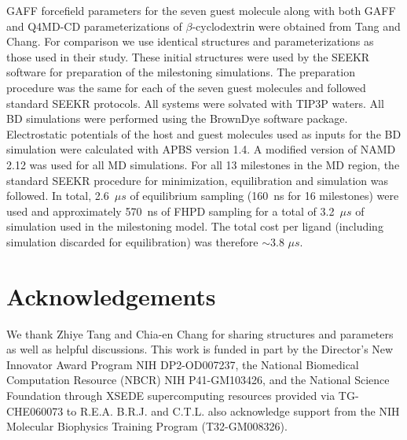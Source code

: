 \par GAFF\cite{Wang2004,Wang2006} forcefield parameters for the seven guest molecule
along with both GAFF and Q4MD-CD\cite{Cezard2011} parameterizations of $\beta$-cyclodextrin
were obtained from Tang and Chang\cite{Tang2017}. For comparison we use identical structures and
parameterizations as those used in their study. These initial structures were
used by the SEEKR software for preparation of the milestoning simulations.
The preparation procedure was the same for each of the seven guest molecules and
followed standard SEEKR protocols\cite{Votapka2017}. All systems were solvated
with TIP3P waters\cite{Jorgensen1983a}. All BD simulations were performed using the BrownDye software package\cite{Huber2010}.
Electrostatic potentials of the host and guest molecules used as inputs for the
BD simulation were calculated with APBS version 1.4\cite{Baker2001}.
A modified version of NAMD 2.12 was used for all MD simulations\cite{Phillips2005}.
For all 13 milestones in the MD region, the standard SEEKR procedure for
minimization, equilibration and simulation was followed. In total, 2.6~${\mu}s$ of equilibrium sampling (160~ns for 16 milestones) were
used and approximately 570~ns of FHPD sampling for a total of 3.2~${\mu}s$ of
simulation used in the milestoning model. The total cost per ligand (including
simulation discarded for equilibration) was therefore $\sim$3.8 ${\mu}s$.

\section{Acknowledgements}
\par {}

\par We thank Zhiye Tang and Chia-en Chang for sharing structures and parameters as
well as helpful discussions. This work is funded in part by the Director's
New Innovator Award Program NIH DP2-OD007237, the National Biomedical Computation
Resource (NBCR) NIH P41-GM103426, and the National Science Foundation through
XSEDE supercomputing resources provided via TG-CHE060073 to R.E.A. B.R.J.
and C.T.L. also acknowledge support from the NIH Molecular Biophysics
Training Program (T32-GM008326).